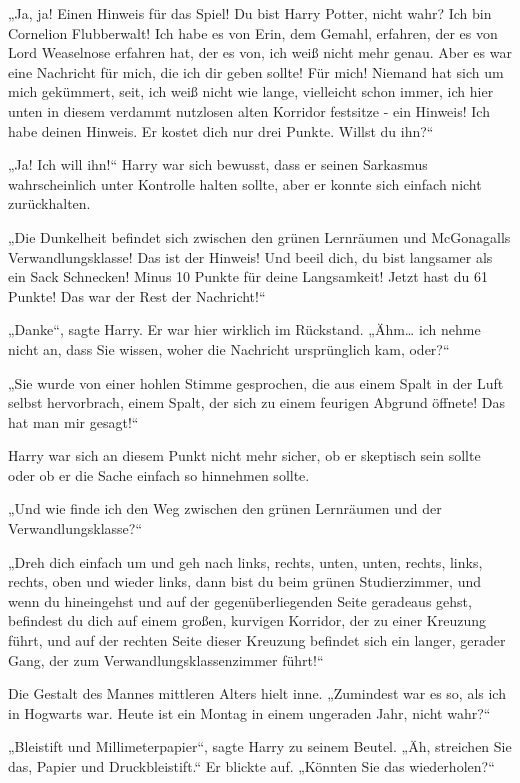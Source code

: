{„Ja, ja! Einen Hinweis für das Spiel! Du bist Harry Potter, nicht wahr? Ich bin Cornelion Flubberwalt! Ich habe es von Erin, dem Gemahl, erfahren, der es von Lord Weaselnose erfahren hat, der es von, ich weiß nicht mehr genau. Aber es war eine Nachricht für mich, die ich dir geben sollte! Für mich! Niemand hat sich um mich gekümmert, seit, ich weiß nicht wie lange, vielleicht schon immer, ich hier unten in diesem verdammt nutzlosen alten Korridor festsitze - ein Hinweis! Ich habe deinen Hinweis. Er kostet dich nur drei Punkte. Willst du ihn?“

„Ja! Ich will ihn!“ Harry war sich bewusst, dass er seinen Sarkasmus wahrscheinlich unter Kontrolle halten sollte, aber er konnte sich einfach nicht zurückhalten.

„Die Dunkelheit befindet sich zwischen den grünen Lernräumen und McGonagalls Verwandlungsklasse! Das ist der Hinweis! Und beeil dich, du bist langsamer als ein Sack Schnecken! Minus 10 Punkte für deine Langsamkeit! Jetzt hast du 61 Punkte! Das war der Rest der Nachricht!“

„Danke“, sagte Harry. Er war hier wirklich im Rückstand. „Ähm… ich nehme nicht an, dass Sie wissen, woher die Nachricht ursprünglich kam, oder?“

„Sie wurde von einer hohlen Stimme gesprochen, die aus einem Spalt in der Luft selbst hervorbrach, einem Spalt, der sich zu einem feurigen Abgrund öffnete! Das hat man mir gesagt!“

Harry war sich an diesem Punkt nicht mehr sicher, ob er skeptisch sein sollte oder ob er die Sache einfach so hinnehmen sollte.

„Und wie finde ich den Weg zwischen den grünen Lernräumen und der Verwandlungsklasse?“

„Dreh dich einfach um und geh nach links, rechts, unten, unten, rechts, links, rechts, oben und wieder links, dann bist du beim grünen Studierzimmer, und wenn du hineingehst und auf der gegenüberliegenden Seite geradeaus gehst, befindest du dich auf einem großen, kurvigen Korridor, der zu einer Kreuzung führt, und auf der rechten Seite dieser Kreuzung befindet sich ein langer, gerader Gang, der zum Verwandlungsklassenzimmer führt!“

Die Gestalt des Mannes mittleren Alters hielt inne. „Zumindest war es so, als ich in Hogwarts war. Heute ist ein Montag in einem ungeraden Jahr, nicht wahr?“

„Bleistift und Millimeterpapier“, sagte Harry zu seinem Beutel. „Äh, streichen Sie das, Papier und Druckbleistift.“ Er blickte auf. „Könnten Sie das wiederholen?“

}
